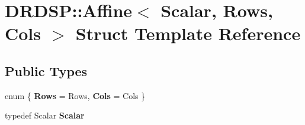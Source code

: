 \hypertarget{struct_d_r_d_s_p_1_1_affine}{\section{D\-R\-D\-S\-P\-:\-:Affine$<$ Scalar, Rows, Cols $>$ Struct Template Reference}
\label{struct_d_r_d_s_p_1_1_affine}
}
\subsection*{Public Types}
\begin{DoxyCompactItemize}
\item 
enum \{ {\bfseries Rows} = Rows, 
{\bfseries Cols} = Cols
 \}
\item 
\hypertarget{struct_d_r_d_s_p_1_1_affine_ab58da3b0753221963944eff5bc304600}{typedef Scalar {\bfseries Scalar}}\label{struct_d_r_d_s_p_1_1_affine_ab58da3b0753221963944eff5bc304600}

\end{DoxyCompactItemize}
